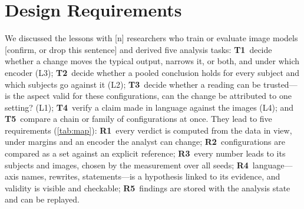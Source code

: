 \documentclass[review]{vgtc}                 %
\newcommand{\pending}[1]{\textcolor{red!70!black}{[#1]}}
\begin{document}
\section{Design Requirements}
\label{sec:requirements}
We discussed the lessons with \pending{n} researchers who train or evaluate image models \pending{confirm, or drop this sentence} and derived five analysis tasks: \textbf{T1}~decide whether a change moves the typical output, narrows it, or both, and under which encoder (L3); \textbf{T2}~decide whether a pooled conclusion holds for every subject and which subjects go against it (L2); \textbf{T3}~decide whether a reading can be trusted---is the aspect valid for these configurations, can the change be attributed to one setting? (L1); \textbf{T4}~verify a claim made in language against the images (L4); and \textbf{T5}~compare a chain or family of configurations at once. They lead to five requirements (\cref{tab:map}):
\textbf{R1}~every verdict is computed from the data in view, under margins and an encoder the analyst can change;
\textbf{R2}~configurations are compared as a set against an explicit reference;
\textbf{R3}~every number leads to its subjects and images, chosen by the measurement over all seeds;
\textbf{R4}~language---axis names, rewrites, statements---is a hypothesis linked to its evidence, and validity is visible and checkable;
\textbf{R5}~findings are stored with the analysis state and can be replayed.
\end{document}
